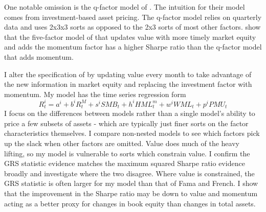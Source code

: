 One notable omission is the q-factor model of \textcite{hou2015digesting}. The intuition
for their model comes from investment-based asset pricing. The q-factor model relies on
quarterly data and uses 2x3x3 sorts as opposed to the 2x3 sorts of most other factors.
\textcite{barillas2017model} show that the five-factor model of \textcite{fama2015five}
that updates value with more timely market equity and adds the momentum factor has a
higher Sharpe ratio than the q-factor model that adds momentum.

I alter the specification of \textcite{fama2015five} by updating value every month to take
advantage of the new information in market equity and replacing the investment factor with
momentum. My model has the time series regression form
\[
R_t^i=a^i+b^iR_t^M+s^iSMB_t+h^iHML_t^m+w^iWML_t+p^iPMU_t
\]
I focus on the differences between models rather than a single model’s ability to price a
few subsets of assets - which are typically just finer sorts on the factor characteristics
themselves. I compare non-nested models to see which factors pick up the slack when other
factors are omitted. Value does much of the heavy lifting, so my model is vulnerable to
sorts which constrain value. I confirm the GRS statistic evidence matches the maximum
squared Sharpe ratio evidence broadly and investigate where the two disagree. Where value
is constrained, the GRS statistic is often larger for my model than that of Fama and
French. I show that the improvement in the Sharpe ratio may be down to value and momentum
acting as a better proxy for changes in book equity than changes in total assets.
